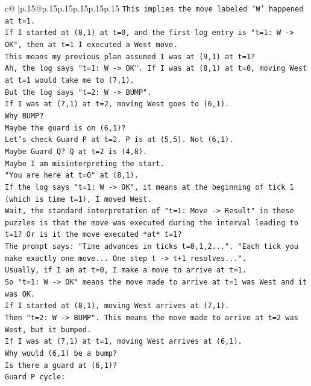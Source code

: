 \documentclass{article}
\begin{document}
{\begin{supertabular}{c@{$\;$}|p{.15\linewidth}@{}p{.15\linewidth}p{.15\linewidth}p{.15\linewidth}p{.15\linewidth}p{.15\linewidth}}
{{{\texttt{This implies the move labeled 'W' happened at t=1.} \\
\texttt{If I started at (8,1) at t=0, and the first log entry is "t=1: W {-}> OK", then at t=1 I executed a West move.} \\
\texttt{This means my previous plan assumed I was at (9,1) at t=1?} \\
\texttt{Ah, the log says "t=1: W {-}> OK". If I was at (8,1) at t=0, moving West at t=1 would take me to (7,1).} \\
\texttt{But the log says "t=2: W {-}> BUMP".} \\
\texttt{If I was at (7,1) at t=2, moving West goes to (6,1).} \\
\texttt{Why BUMP?} \\
\texttt{Maybe the guard is on (6,1)?} \\
\texttt{Let's check Guard P at t=2. P is at (5,5). Not (6,1).} \\
\texttt{Maybe Guard Q? Q at t=2 is (4,8).} \\
\texttt{Maybe I am misinterpreting the start.} \\
\texttt{"You are here at t=0" at (8,1).} \\
\texttt{If the log says "t=1: W {-}> OK", it means at the beginning of tick 1 (which is time t=1), I moved West.} \\
\texttt{Wait, the standard interpretation of "t=1: Move {-}> Result" in these puzzles is that the move was executed during the interval leading to t=1? Or is it the move executed *at* t=1?} \\
\texttt{The prompt says: "Time advances in ticks t=0,1,2...". "Each tick you make exactly one move... One step t {-}> t+1 resolves...".} \\
\texttt{Usually, if I am at t=0, I make a move to arrive at t=1.} \\
\texttt{So "t=1: W {-}> OK" means the move made to arrive at t=1 was West and it was OK.} \\
\texttt{If I started at (8,1), moving West arrives at (7,1).} \\
\texttt{Then "t=2: W {-}> BUMP". This means the move made to arrive at t=2 was West, but it bumped.} \\
\texttt{If I was at (7,1) at t=1, moving West arrives at (6,1).} \\
\texttt{Why would (6,1) be a bump?} \\
\texttt{Is there a guard at (6,1)?} \\
\texttt{Guard P cycle:} \\
}}}
\end{supertabular}}
\end{document}
